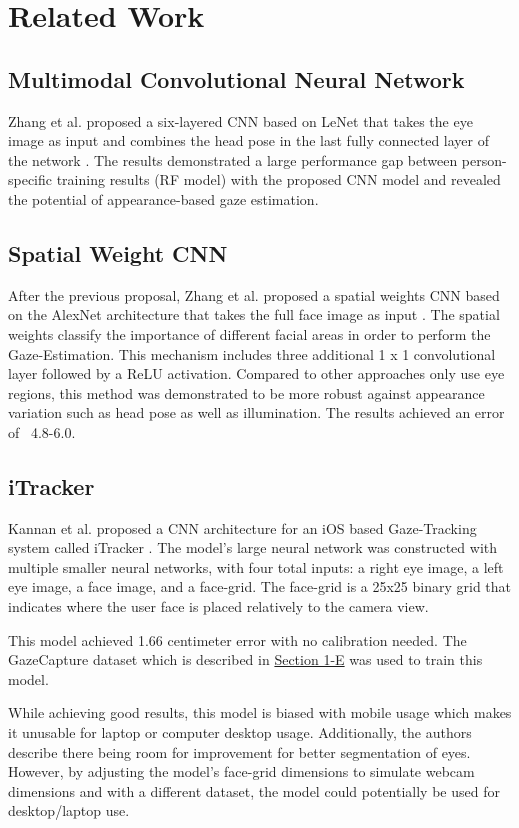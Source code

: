 \section{Related Work}


\subsection{Multimodal Convolutional Neural Network}
Zhang et al. proposed a six-layered CNN based on LeNet that takes the eye image as input and combines the head pose in the last fully connected layer of the network \cite{GazeEstimationInTheWild}. The results demonstrated a large performance gap between person-specific training results (RF model) with the proposed CNN model and revealed the potential of appearance-based gaze estimation.

\subsection{Spatial Weight CNN}
After the previous proposal, Zhang et al. proposed a spatial weights CNN based on the AlexNet architecture \cite{alex_net} that takes the full face image as input \cite{written_all_over_your_face}. The spatial weights classify the importance of different facial areas in order to perform the Gaze-Estimation. This mechanism includes three additional 1 x 1 convolutional layer followed by a ReLU activation. Compared to other approaches only use eye regions, this method was demonstrated to be more robust against appearance variation such as head pose as well as illumination. The results achieved an error of ~4.8-6.0\degree.

\subsection{iTracker}
Kannan et al. proposed a CNN architecture for an iOS based Gaze-Tracking system called iTracker \cite{iTracker}. The model's large neural network was constructed with multiple smaller neural networks, with four total inputs: a right eye image, a left eye image, a face image, and a face-grid. The face-grid is a 25x25 binary grid that indicates where the user face is placed relatively to the camera view. 

This model achieved 1.66 centimeter error with no calibration needed. The GazeCapture dataset which is described in \hyperref[state-art-datasets]{Section 1-E} was used to train this model.

While achieving good results, this model is biased with mobile usage which makes it unusable for laptop or computer desktop usage. Additionally, the authors describe there being room for improvement for better segmentation of eyes. However, by adjusting the model's face-grid dimensions to simulate webcam dimensions and with a different dataset, the model could potentially be used for desktop/laptop use.

